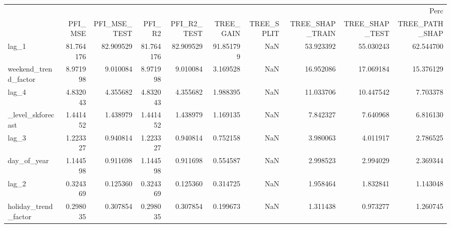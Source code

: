 \begin{tabular}{lrrrrrrrrr}
\toprule
 & \multicolumn{9}{r}{Perc} \\
 & PFI_MSE & PFI_MSE_TEST & PFI_R2 & PFI_R2_TEST & TREE_GAIN & TREE_SPLIT & TREE_SHAP_TRAIN & TREE_SHAP_TEST & TREE_PATH_SHAP \\
\midrule
lag_1 & 81.764176 & 82.909529 & 81.764176 & 82.909529 & 91.851799 & NaN & 53.923392 & 55.030243 & 62.544700 \\
weekend_trend_factor & 8.971998 & 9.010084 & 8.971998 & 9.010084 & 3.169528 & NaN & 16.952086 & 17.069184 & 15.376129 \\
lag_4 & 4.832043 & 4.355682 & 4.832043 & 4.355682 & 1.988395 & NaN & 11.033706 & 10.447542 & 7.703378 \\
_level_skforecast & 1.441452 & 1.438979 & 1.441452 & 1.438979 & 1.169135 & NaN & 7.842327 & 7.640968 & 6.816130 \\
lag_3 & 1.223327 & 0.940814 & 1.223327 & 0.940814 & 0.752158 & NaN & 3.980063 & 4.011917 & 2.786525 \\
day_of_year & 1.144598 & 0.911698 & 1.144598 & 0.911698 & 0.554587 & NaN & 2.998523 & 2.994029 & 2.369344 \\
lag_2 & 0.324369 & 0.125360 & 0.324369 & 0.125360 & 0.314725 & NaN & 1.958464 & 1.832841 & 1.143048 \\
holiday_trend_factor & 0.298035 & 0.307854 & 0.298035 & 0.307854 & 0.199673 & NaN & 1.311438 & 0.973277 & 1.260745 \\
\bottomrule
\end{tabular}
